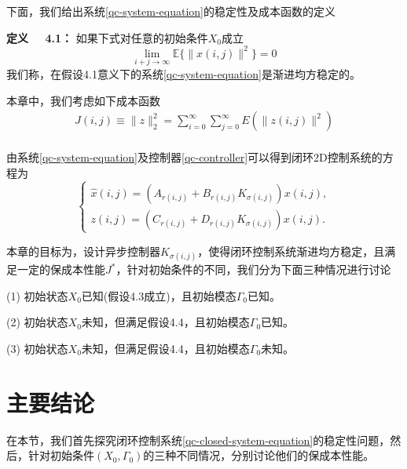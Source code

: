 	下面，我们给出系统\eqref{qc-system-equation}的稳定性及成本函数的定义
	
	{\bf 定义 \ \ 4.1：}
	如果下式对任意的初始条件$X_{0}$成立
	\begin{equation}\label{qc-AMSS}
	\lim\limits_{i+j\to\infty}\mathbb{E}\{\|x(i,j)\|^{2}\} = 0
	\end{equation}
	我们称，在假设4.1意义下的系统\eqref{qc-system-equation}是渐进均方稳定的。
	
	本章中，我们考虑如下成本函数
	\begin{equation}\label{qccostfuntion}
	\begin{split}
	J(i,j) \equiv \|z\|_{2}^{2} = \sum_{i=0}^{\infty}\sum_{j=0}^{\infty}E(\|z(i,j)\|^{2})\\
	\end{split}
	\end{equation}
	
	由系统\eqref{qc-system-equation}及控制器\eqref{qc-controller}可以得到闭环2D控制系统的方程为
	\begin{equation}\label{qc-closed-system-equation}
		\left\{
			\begin{array}{lr}
				\hat{x}(i,j) = (A_{r(i,j)}+B_{r(i,j)}K_{\sigma(i,j)})x(i,j), \\
				z(i,j) = (C_{r(i,j)}+D_{r(i,j)}K_{\sigma(i,j)})x(i,j).
			\end{array}
		\right.
	\end{equation}
	
	本章的目标为，设计异步控制器$K_{\sigma(i,j)}$，使得闭环控制系统渐进均方稳定，且满足一定的保成本性能$J^{*}$，针对初始条件的不同，我们分为下面三种情况进行讨论
	
	(1) 初始状态$X_{0}$已知(假设4.3成立)，且初始模态$\varGamma_{0}$已知。
	
	(2) 初始状态$X_{0}$未知，但满足假设4.4，且初始模态$\varGamma_{0}$已知。
	
	(3) 初始状态$X_{0}$未知，但满足假设4.4，且初始模态$\varGamma_{0}$未知。
	

\section{主要结论}
	在本节，我们首先探究闭环控制系统\eqref{qc-closed-system-equation}的稳定性问题，然后，针对初始条件$(X_{0}, \varGamma_{0})$的三种不同情况，分别讨论他们的保成本性能。
	

